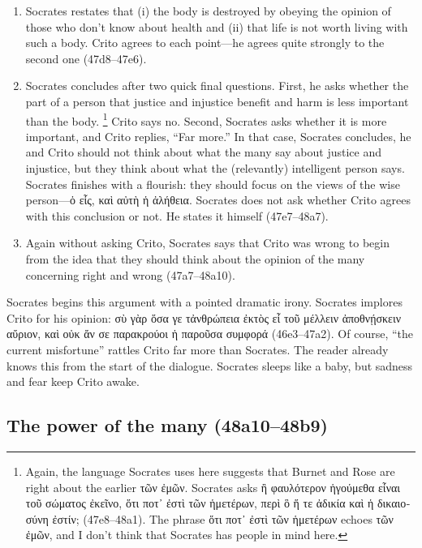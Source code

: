 \documentclass[12pt,letterpaper]{article}
\begin{document}
\begin{enumerate}
    \item Socrates restates that (i) the body is destroyed by obeying the opinion of those who don't know about health and (ii) that life is not worth living with such a body.
        Crito agrees to each point---he agrees quite strongly to the second one (47d8--47e6).

    \item Socrates concludes after two quick final questions.
        First, he asks whether the part of a person that justice and injustice benefit and harm is less important than the body.%
\footnote{Again, the language Socrates uses here suggests that Burnet and Rose are right about the earlier \textgreek{τῶν ἐμῶν}.
        Socrates asks \textgreek{ἢ φαυλότερον ἡγούμεθα εἶναι τοῦ σώματος ἐκεῖνο, ὅτι ποτ᾽ ἐστὶ τῶν ἡμετέρων, περὶ ὃ ἥ τε ἀδικία καὶ ἡ δικαιοσύνη ἐστίν;} (47e8--48a1).
        The phrase \textgreek{ὅτι ποτ᾽ ἐστὶ τῶν ἡμετέρων} echoes \textgreek{τῶν ἐμῶν}, and I don't think that Socrates has people in mind here.}
        Crito says no.
        Second, Socrates asks whether it is more important, and Crito replies, ``Far more.''
        In that case, Socrates concludes, he and Crito should not think about what the many say about justice and injustice, but they think about what the (relevantly) intelligent person says.
        Socrates finishes with a flourish: they should focus on the views of the wise person---\textgreek{ὁ εἷς, καὶ αὐτὴ ἡ ἀλήθεια}.
        Socrates does not ask whether Crito agrees with this conclusion or not.
        He states it himself (47e7--48a7).

    \item Again without asking Crito, Socrates says that Crito was wrong to begin from the idea that they should think about the opinion of the many concerning right and wrong (47a7--48a10).

\end{enumerate}

Socrates begins this argument with a pointed dramatic irony.
Socrates implores Crito for his opinion: \textgreek{σὺ γὰρ ὅσα γε τἀνθρώπεια ἐκτὸς εἶ τοῦ μέλλειν ἀποθνῄσκειν αὔριον, καὶ οὐκ ἄν σε παρακρούοι ἡ παροῦσα συμφορά} (46e3--47a2).
Of course, ``the current misfortune'' rattles Crito far more than Socrates.
The reader already knows this from the start of the dialogue.
Socrates sleeps like a baby, but sadness and fear keep Crito awake.

\subsection*{The power of the many (48a10--48b9)}
\end{document}
